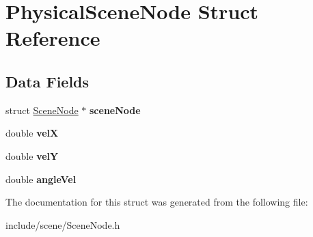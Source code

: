 \hypertarget{struct_physical_scene_node}{}\section{Physical\+Scene\+Node Struct Reference}
\label{struct_physical_scene_node}
\subsection*{Data Fields}
\begin{DoxyCompactItemize}
\item 
\hypertarget{struct_physical_scene_node_a423738fbe912b45f31f4d80af3aa244a}{}\label{struct_physical_scene_node_a423738fbe912b45f31f4d80af3aa244a} 
struct \hyperlink{struct_scene_node}{Scene\+Node} $\ast$ {\bfseries scene\+Node}
\item 
\hypertarget{struct_physical_scene_node_ab342837870f4b8ce8fd2bb48419e0600}{}\label{struct_physical_scene_node_ab342837870f4b8ce8fd2bb48419e0600} 
double {\bfseries velX}
\item 
\hypertarget{struct_physical_scene_node_a6dcefa93242bac42ac5433d1a219a1ad}{}\label{struct_physical_scene_node_a6dcefa93242bac42ac5433d1a219a1ad} 
double {\bfseries velY}
\item 
\hypertarget{struct_physical_scene_node_a312db103482db7bf9bf68f1ab9c5e0e1}{}\label{struct_physical_scene_node_a312db103482db7bf9bf68f1ab9c5e0e1} 
double {\bfseries angle\+Vel}
\end{DoxyCompactItemize}


The documentation for this struct was generated from the following file\+:\begin{DoxyCompactItemize}
\item 
include/scene/Scene\+Node.\+h\end{DoxyCompactItemize}
